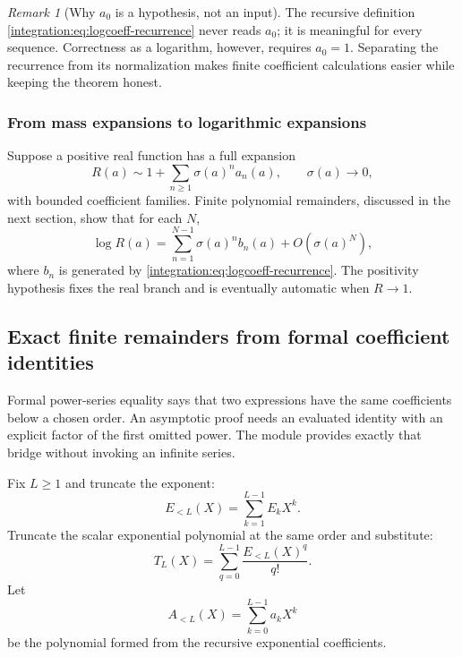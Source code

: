 \documentclass[11pt,oneside]{article}
\theoremstyle{definition}
\theoremstyle{remark}
\newtheorem{remark}[theorem]{Remark}
\begin{document}
\begin{remark}[Why $a_0$ is a hypothesis, not an input]
The recursive definition \eqref{integration:eq:logcoeff-recurrence} never reads $a_0$; it is meaningful
for every sequence.  Correctness as a logarithm, however, requires $a_0=1$.  Separating the
recurrence from its normalization makes finite coefficient calculations easier while keeping
the theorem honest.
\end{remark}

\subsubsection{From mass expansions to logarithmic expansions}

Suppose a positive real function has a full expansion
\begin{equation}
 R(a)\sim1+\sum_{n\ge1}\sigma(a)^na_n(a),
 \qquad \sigma(a)\to0,
 \label{integration:eq:mass-expansion-before-log}
\end{equation}
with bounded coefficient families.  Finite polynomial remainders, discussed in the next
section, show that for each $N$,
\begin{equation}
 \log R(a)=\sum_{n=1}^{N-1}\sigma(a)^nb_n(a)+O(\sigma(a)^N),
 \label{integration:eq:log-asymptotic-transfer}
\end{equation}
where $b_n$ is generated by \eqref{integration:eq:logcoeff-recurrence}.  The positivity hypothesis fixes
the real branch and is eventually automatic when $R\to1$.

\subsection{Exact finite remainders from formal coefficient identities}
\label{integration:sec:finite-remainder}

Formal power-series equality says that two expressions have the same coefficients below a
chosen order.  An asymptotic proof needs an evaluated identity with an explicit factor of the
first omitted power.  The module  provides exactly
that bridge without invoking an infinite series.

Fix $L\ge1$ and truncate the exponent:
\begin{equation}
 E_{<L}(X)=\sum_{k=1}^{L-1}E_kX^k.
 \label{integration:eq:exponent-trunc-polynomial}
\end{equation}
Truncate the scalar exponential polynomial at the same order and substitute:
\begin{equation}
 T_L(X)=\sum_{q=0}^{L-1}\frac{E_{<L}(X)^q}{q!}.
 \label{integration:eq:finite-exp-substitution}
\end{equation}
Let
\begin{equation}
 A_{<L}(X)=\sum_{k=0}^{L-1}a_kX^k
 \label{integration:eq:expcoeff-trunc-polynomial}
\end{equation}
be the polynomial formed from the recursive exponential coefficients.
\end{document}
